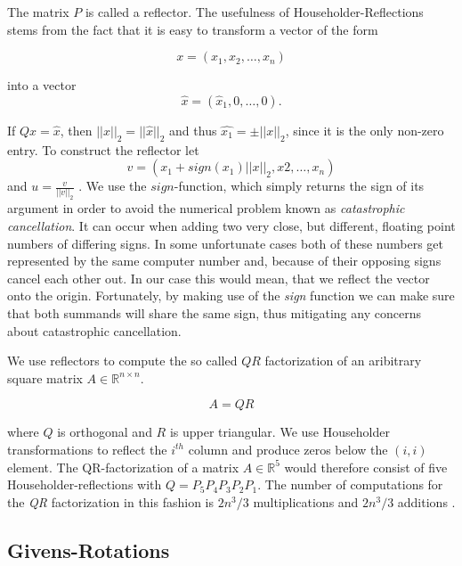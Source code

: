 \documentclass[12pt]{article}
\begin{document}
The matrix $P$ is called a reflector. The usefulness of Householder-Reflections stems from the fact that it is easy to transform a vector of the form

$$x = (x_1, x_2, \dots, x_n)$$

into a vector
$$\hat{x} = (\hat{x}_1, 0, \dots, 0).$$

If $Qx = \hat{x}$, then $||x||_2 = ||\hat{x}||_2$ and thus $\hat{x_1} = \pm ||x||_2$, since it is the only non-zero entry. To construct the reflector let
\begin{equation}
\label{house-con}
v = (x_1 + sign(x_1)||x||_2, x2, \dots, x_n)
\end{equation}
and $u = \frac{v}{||v||_2}$ \cite{NLA}. We use the $sign$-function, which simply returns the sign of its argument in order to avoid the numerical problem known as \textit{catastrophic cancellation}. It can occur when adding two very close, but different, floating point numbers of differing signs. In some unfortunate cases both of these numbers get represented by the same computer number and, because of their opposing signs cancel each other out. In our case this would mean, that we reflect the vector onto the origin. Fortunately, by making use of the \textit{sign} function we can make sure that both summands will share the same sign, thus mitigating any concerns about catastrophic cancellation.

We use reflectors to compute the so called $QR$ factorization of an aribitrary square matrix $A \in \mathbb{R}^{n \times n}$.

\begin{equation}
\label{QR-prop}
A = QR
\end{equation}

where $Q$ is orthogonal and $R$ is upper triangular. We use Householder transformations to reflect the $i^{th}$ column and produce zeros below the $(i, i)$ element. The QR-factorization of a matrix $A \in \mathbb{R}^5$ would therefore consist of five Householder-reflections with $Q=P_5 P_4 P_3 P_2 P_1$. The number of computations for the \textit{QR} factorization in this fashion is $2n^3 / 3$ multiplications and $2n^3 / 3$ additions \cite{NLA}.  
\subsection{Givens-Rotations}
\end{document}

